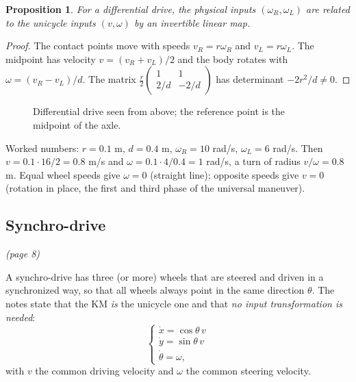 \documentclass[11pt,a4paper]{article}
\theoremstyle{definition}
\theoremstyle{plain}
\newtheorem{proposition}[definition]{Proposition}
\theoremstyle{remark}
\begin{document}
\begin{proposition}
For a differential drive, the physical inputs $(\omega_R,\omega_L)$ are related to the unicycle inputs $(v,\omega)$ by an invertible linear map.
\end{proposition}
\begin{proof}
The contact points move with speeds $v_R=r\omega_R$ and $v_L=r\omega_L$. The midpoint has velocity $v=(v_R+v_L)/2$ and the body rotates with $\omega=(v_R-v_L)/d$. The matrix $\frac r2\begin{pmatrix}1&1\\ 2/d&-2/d\end{pmatrix}$ has determinant $-2r^2/d\neq0$.
\end{proof}

\begin{figure}[h]
\centering
{}
\caption{Differential drive seen from above; the reference point is the midpoint of the axle.}
\end{figure}

\begin{intuition}
Worked numbers: $r=0.1$ m, $d=0.4$ m, $\omega_R=10$ rad/s, $\omega_L=6$ rad/s. Then $v=0.1\cdot16/2=0.8$ m/s and $\omega=0.1\cdot4/0.4=1$ rad/s, a turn of radius $v/\omega=0.8$ m. Equal wheel speeds give $\omega=0$ (straight line); opposite speeds give $v=0$ (rotation in place, the first and third phase of the universal maneuver).
\end{intuition}

\subsection{Synchro-drive}\emph{(page 8)}

A synchro-drive has three (or more) wheels that are steered and driven in a synchronized way, so that all wheels always point in the same direction $\theta$. The notes state that the KM \emph{is} the unicycle one and that \emph{no input transformation is needed}:
\[
\begin{cases}\dot x=\cos\theta\,v\\ \dot y=\sin\theta\,v\\ \dot\theta=\omega ,\end{cases}
\]
with $v$ the common driving velocity and $\omega$ the common steering velocity.
\end{document}
